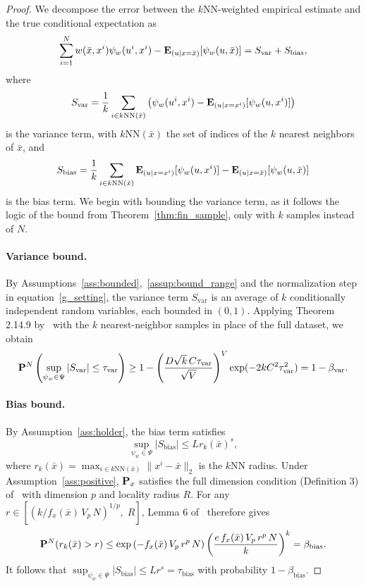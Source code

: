 \begin{proof}
We decompose the error between the $k$NN-weighted empirical estimate and the true conditional expectation as
$$\sum_{i=1}^N w(\bar{x}, x^i) \psi_w(u^i, x^i) - \mathbf{E}_{(u | x = \bar{x})}[\psi_w(u, \bar{x})] = S_{\mathrm{var}} + S_{\mathrm{bias}},$$
where
$$S_{\mathrm{var}} = \frac{1}{k}\sum_{i \in k\text{NN}(\bar{x})} \left(\psi_w(u^{i}, x^{i}) - \mathbf{E}_{(u | x = x^{i})}[\psi_w(u, x^{i})]\right)$$
is the variance term, with $k\text{NN}(\bar{x})$ the set of indices of the $k$ nearest neighbors of $\bar{x}$, and
$$S_{\mathrm{bias}} = \frac{1}{k}\sum_{i \in k\text{NN}(\bar{x})} \mathbf{E}_{(u | x = x^{i})}[\psi_w(u, x^{i})] - \mathbf{E}_{(u | x = \bar{x})}[\psi_w(u, \bar{x})]$$
is the bias term. We begin with bounding the variance term, as it follows the logic of the bound from Theorem~\ref{thm:fin_sample}, only with $k$ samples instead of $N$.

\paragraph{Variance bound.}
By Assumptions~\ref{ass:bounded},~\ref{assup:bound_range} and the normalization step in equation~\eqref{g_setting}, the variance term $S_{\mathrm{var}}$ is an average of $k$ conditionally independent random variables, each bounded in $(0,1)$.
Applying Theorem 2.14.9 by~\cite{empirical} with the $k$ nearest-neighbor samples in place of the full dataset, we obtain
$${\mathbf P}^{N}\left (\sup_{\psi_{w} \in \Psi} |S_{\mathrm{var}}| \leq \tau_{\mathrm{var}}\right ) \geq 1 - \left (\frac{D\sqrt{k}\,C\tau_{\mathrm{var}}}{\sqrt{V}}\right )^V\exp(-2kC^2\tau_{\mathrm{var}}^2) = 1 - \beta_{\mathrm{var}}.$$

\paragraph{Bias bound.}
By Assumption~\ref{ass:holder}, the bias term satisfies
$$\sup_{\psi_w \in \Psi} |S_{\mathrm{bias}}| \leq L r_k(\bar{x})^s,$$
where $r_k(\bar{x}) = \max_{i \in k\text{NN}(\bar{x})} \|x^{i} - \bar{x}\|_2$ is the $k$NN radius.
Under Assumption~\ref{ass:positive}, ${\mathbf P}_x$ satisfies the full dimension condition (Definition 3) of~\cite{singh2016knn} with dimension $p$ and locality radius $R$.
For any $r \in \left[\left(k/f_x(\bar{x})\, V_p\, N\right)^{1/p},\; R\right]$, Lemma 6 of~\cite{singh2016knn} therefore gives
$${\mathbf P}^N(r_k(\bar{x}) > r) \leq \exp\left(-f_x(\bar{x})\, V_p\, r^p\, N\right)\left(\frac{e\,f_x(\bar{x})\, V_p\, r^p\, N}{k}\right)^k = \beta_{\mathrm{bias}}.$$
It follows that $\sup_{\psi_w \in \Psi} |S_{\mathrm{bias}}| \leq L r^{s} = \tau_{\mathrm{bias}} $ with probability $ 1 - \beta_{\mathrm{bias}}$.


\end{proof}
